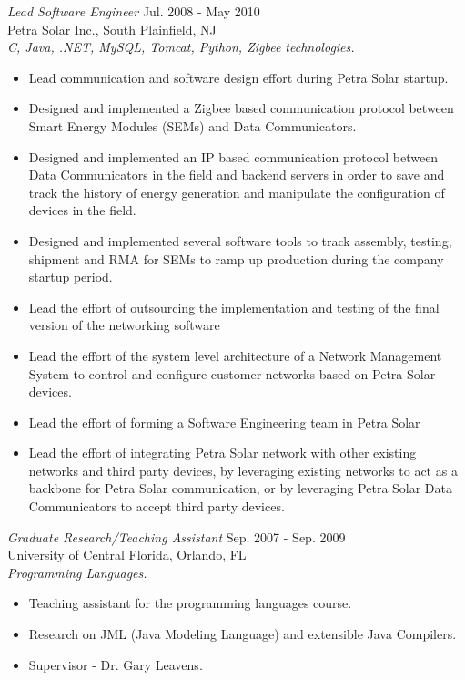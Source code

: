 \documentclass[line,margin]{res}
\begin{document}
\begin{resume}
{\sl Lead Software Engineer} \hfill        Jul. 2008 - May 2010  \\
Petra Solar Inc., South Plainfield, NJ \\
\textit{C, Java, .NET, MySQL, Tomcat, Python, Zigbee technologies.}
\begin{itemize} \itemsep -2pt
     \item  Lead communication and software design effort during Petra Solar
     startup.
     \item  Designed and implemented a Zigbee based communication protocol
     between Smart Energy Modules (SEMs) and Data Communicators.
     \item  Designed and implemented an IP based communication protocol between
     Data Communicators in the field and backend servers in order to save and
     track the history of energy generation and manipulate the configuration of
     devices in the field.
     \item  Designed and implemented several software tools to track assembly,
     testing, shipment and RMA for SEMs to ramp up production during the
     company startup period.
     \item  Lead the effort of outsourcing the implementation and testing of
     the final version of the networking software
     \item  Lead the effort of the system level architecture of a Network
     Management System to control and configure customer networks based on
     Petra Solar devices.
     \item  Lead the effort of forming a Software Engineering team in Petra
     Solar
     \item  Lead the effort of integrating Petra Solar network with other
     existing networks and third party devices, by leveraging existing networks
     to act as a backbone for Petra Solar communication, or by leveraging Petra
     Solar Data Communicators to accept third party devices.
\end{itemize} 

{\sl Graduate Research/Teaching Assistant} \hfill   Sep. 2007 - Sep. 2009 \\
University of Central Florida, Orlando, FL \\
\textit{Programming Languages.}
\begin{itemize} \itemsep -2pt
     \item Teaching assistant for the programming languages course.
     \item Research on JML (Java Modeling Language) and extensible Java
     Compilers.
     \item Supervisor - Dr. Gary Leavens.
\end{itemize} 


\end{resume}
\end{document}
